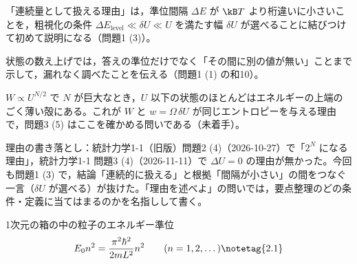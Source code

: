 \documentclass[uplatex,dvipdfmx,a4paper,11pt]{jsarticle}
\begin{document}
\matome
\begin{saitenichiran}
\end{saitenichiran}
\begin{daiji}
  \item 「連続量として扱える理由」は，準位間隔 $\Delta E$ が $\kB T$ より桁違いに小さいことを，粗視化の条件 $\Delta E_{\mathrm{level}}\ll\delta U\ll U$ を満たす幅 $\delta U$ が選べることに結びつけて初めて説明になる（問題1 (3)）。
  \item 状態の数え上げでは，答えの準位だけでなく「その間に別の値が無い」ことまで示して，漏れなく調べたことを伝える（問題1 (1) の和10）。
  \item $W\propto U^{N/2}$ で $N$ が巨大なとき，$U$ 以下の状態のほとんどはエネルギーの上端のごく薄い殻にある。これが $W$ と $w=\Omega\,\delta U$ が同じエントロピーを与える理由で，問題3 (5) はここを確かめる問いである（未着手）。
\end{daiji}
\begin{maemo}
  \item 理由の書き落とし：統計力学1-1（旧版）問題2 (4)（2026-10-27）で「$2^{N}$ になる理由」，統計力学1-1 問題3 (4)（2026-11-11）で $\Delta U=0$ の理由が無かった。今回も問題1 (3) で，結論「連続的に扱える」と根拠「間隔が小さい」の間をつなぐ一言（$\delta U$ が選べる）が抜けた。「理由を述べよ」の問いでは，要点整理のどの条件・定義に当てはまるのかを名指しして書く。
\end{maemo}

\youtenseiri
\begin{noteshikilist}
  \item 1次元の箱の中の粒子のエネルギー準位 %
    \[ E_{0}n^{2}=\frac{\pi^{2}\hbar^{2}}{2mL^{2}}n^{2}\qquad(n=1,2,\dots) \notetag{2.1} \]
\end{noteshikilist}
\end{document}

